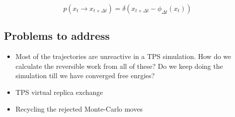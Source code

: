 \documentclass{article}
\begin{document}
\begin{equation}
p(x_t\rightarrow x_{t+\Delta t}) = \delta(x_{t+\Delta t}-\phi_{\Delta t}(x_t))
\end{equation}

\subsection{Problems to address}

\begin{itemize}
\item Most of the trajectories are unreactive in a TPS simulation. How do we calculate the 
reversible work from all of these? Do we keep doing the simulation till we have converged 
free enrgies? 
\item TPS virtual replica exchange \cite{Brotzakis19JChemPhys151p174111} 
\item Recycling the rejected Monte-Carlo moves \cite{Frenkel17571}
\end{itemize}


\end{document}
